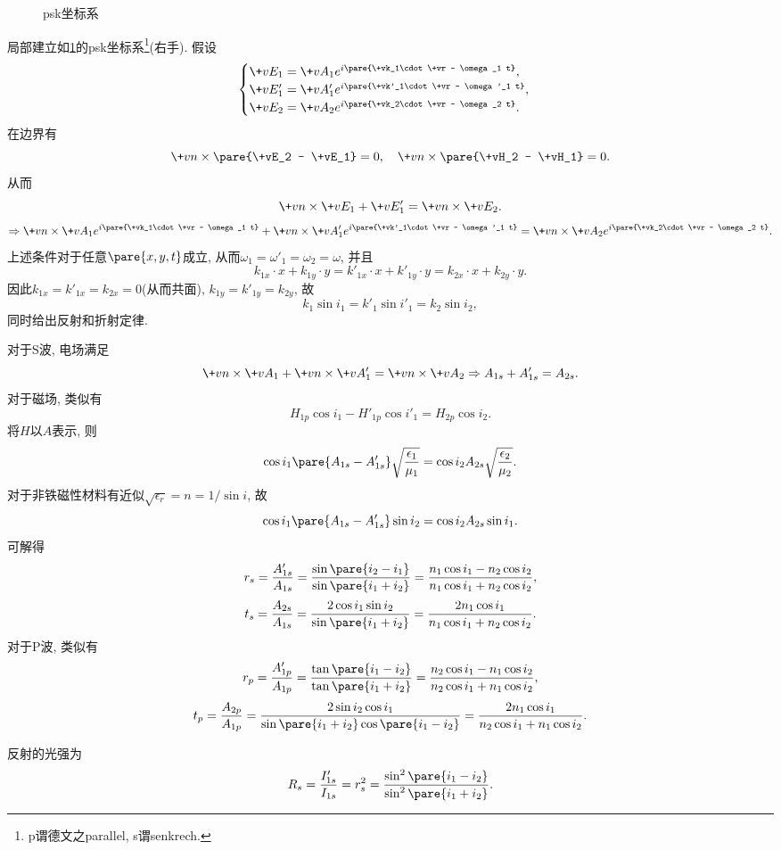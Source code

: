 \documentclass{ctexart}
\begin{document}
\begin{figure}
    \centering
    \caption{psk坐标系}
    \label{fig:psk坐标系}
\end{figure}
局部建立如\cref{fig:psk坐标系}的psk坐标系\footnote{p谓德文之parallel, s谓senkrech.}(右手). 假设
\[ \begin{cases}
    \+vE_1 = \+vA_1 e^{i\pare{\+vk_1\cdot \+vr - \omega_1 t}},\\
    \+vE'_1 = \+vA'_1 e^{i\pare{\+vk'_1\cdot \+vr - \omega'_1 t}},\\
    \+vE_2 = \+vA_2 e^{i\pare{\+vk_2\cdot \+vr - \omega_2 t}}.
\end{cases} \]
在边界有
\[ \+vn\times \pare{\+vE_2 - \+vE_1} = 0,\quad \+vn\times\pare{\+vH_2 - \+vH_1} = 0. \]
从而
\[ \+vn\times{\+vE_1 + \+vE'_1} = \+vn\times\+vE_2. \]
\[ \Rightarrow \+vn\times \+vA_1 e^{i\pare{\+vk_1\cdot \+vr - \omega_1 t}} + \+vn\times \+vA'_1 e^{i\pare{\+vk'_1\cdot \+vr - \omega'_1 t}} = \+vn\times \+vA_2 e^{i\pare{\+vk_2\cdot \+vr - \omega_2 t}}. \]
上述条件对于任意$\pare{x,y,t}$成立, 从而$\omega_1 = \omega'_1 = \omega_2 = \omega$, 并且
\[ k_{1x} \cdot x + k_{1y} \cdot y = k'_{1x}\cdot x + k'_{1y}\cdot y = k_{2x} \cdot x + k_{2y}\cdot y. \]
因此$k_{1x} = k'_{1x} = k_{2x} = 0$(从而共面), $k_{1y} = k'_{1y} = k_{2y}$, 故
\[ k_1 \sin i_1 = k'_1 \sin i'_1 = k_2 \sin i_2, \]
同时给出反射和折射定律.
\par
对于S波, 电场满足
\[ \+vn\times\+vA_1 + \+vn\times\+vA'_1 = \+vn\times\+vA_2 \Rightarrow A_{1s} + A'_{1s} = A_{2s}. \]
对于磁场, 类似有
\[ H_{1p} \cos i_1 - H'_{1p}\cos i'_1 = H_{2p}\cos i_2. \]
将$H$以$A$表示, 则
\[ \cos i_1 \pare{A_{1s} - A'_{1s}}\sqrt{\frac{\epsilon_1}{\mu_1}} = \cos i_2 A_{2s}\sqrt{\frac{\epsilon_2}{\mu_2}}. \]
对于非铁磁性材料有近似$\sqrt{\epsilon_r} = n = 1/\sin i$, 故
\[ \cos i_1 \pare{A_{1s} - A'_{1s}} \sin i_2 = \cos i_2 A_{2s} \sin i_1. \]
可解得
\[ r_s = \frac{A'_{1s}}{A_{1s}} = \frac{\sin \pare{i_2 - i_1}}{\sin \pare{i_1+i_2}} = \frac{n_1\cos i_1 - n_2\cos i_2}{n_1\cos i_1 + n_2 \cos i_2}, \]
\[ t_s = \frac{A_{2s}}{A_{1s}} = \frac{2\cos i_1\sin i_2}{\sin \pare{i_1+i_2}} = \frac{2n_1 \cos i_1}{n_1\cos i_1 + n_2\cos i_2}. \]
对于P波, 类似有
\[ r_p = \frac{A'_{1p}}{A_{1p}} = \frac{\tan\pare{i_1 - i_2}}{\tan\pare{i_1+i_2}} = \frac{n_2\cos i_1 - n_1\cos i_2}{n_2\cos i_1 + n_1\cos i_2}, \]
\[ t_p = \frac{A_{2p}}{A_{1p}} = \frac{2\sin i_2 \cos i_1}{\sin\pare{i_1 + i_2}\cos\pare{i_1 - i_2}} = \frac{2n_1\cos i_1}{n_2\cos i_1 + n_1\cos i_2}. \]
\par
反射的光强为
\[ R_s = \frac{I'_{1s}}{I_{1s}} = r_s^2 = \frac{\sin^2\pare{i_1-i_2}}{\sin^2\pare{i_1+i_2}}. \]
\end{document}
